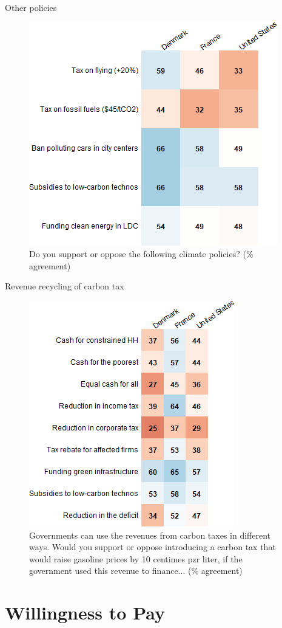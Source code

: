 \documentclass[aspectratio=169,9pt,dvipsnames]{beamer}
\begin{document}
\begin{frame}{Other policies}%
\begin{figure}[h!]
\centering
\caption{Do you support or oppose the following climate policies? (\% agreement)}
\vspace{2mm}
\includegraphics[width=.5\textwidth]{../figures/country_comparison/policy_positive_countries.png}
\end{figure}
\end{frame}

\begin{frame}{Revenue recycling of carbon tax}%
\begin{figure}[h!]
\centering
\caption{Governments can use the revenues from carbon taxes in different ways. Would you support or oppose introducing a carbon tax that would raise gasoline prices by 10 centimes pzr liter, if the government used this revenue to finance... (\% agreement)}
\vspace{2mm}
\includegraphics[width=.4\textwidth]{../figures/country_comparison/tax_positive_countries.png}
\end{figure}
\end{frame}

\section{Willingness to Pay}
\end{document}
